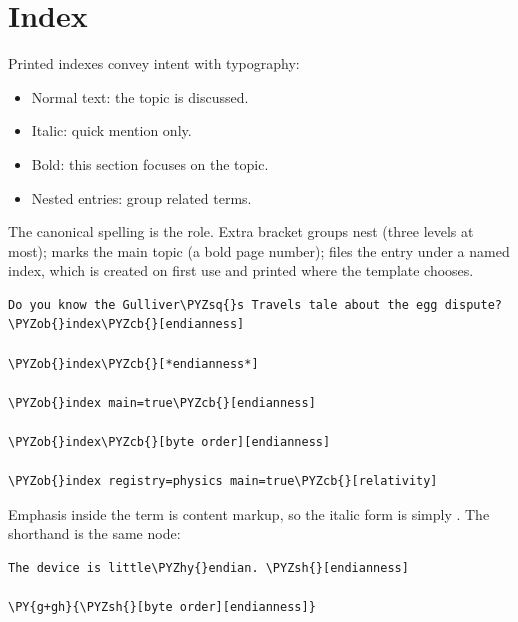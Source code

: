 \documentclass[a4paper,twoside]{article}
\begin{document}
\section{Index}
Printed indexes convey intent with typography:
\begin{itemize}
\item Normal text: the topic is discussed.
\item Italic: quick mention only.
\item Bold: this section focuses on the topic.
\item Nested entries: group related terms.
\end{itemize}
The canonical spelling is the  role. Extra bracket groups nest (three
levels at most);  marks the main topic (a bold page number);
 files the entry under a named index, which is created on first use
and printed where the template chooses.
\begin{tscode}[lang=md, engine=pygments]
\begin{Verbatim}[commandchars=\\\{\},breaklines, breakanywhere, commandchars=\\\{\}]
Do you know the Gulliver\PYZsq{}s Travels tale about the egg dispute? \PYZob{}index\PYZcb{}[endianness]

\PYZob{}index\PYZcb{}[*endianness*]

\PYZob{}index main=true\PYZcb{}[endianness]

\PYZob{}index\PYZcb{}[byte order][endianness]

\PYZob{}index registry=physics main=true\PYZcb{}[relativity]
\end{Verbatim}
\end{tscode}
Emphasis inside the term is content markup, so the italic form is simply
. The shorthand \tscodeinline{\#[…]} is the same node:
\begin{tscode}[lang=md, engine=pygments]
\begin{Verbatim}[commandchars=\\\{\},breaklines, breakanywhere, commandchars=\\\{\}]
The device is little\PYZhy{}endian. \PYZsh{}[endianness]

\PY{g+gh}{\PYZsh{}[byte order][endianness]}
\end{Verbatim}
\end{tscode}
\end{document}
